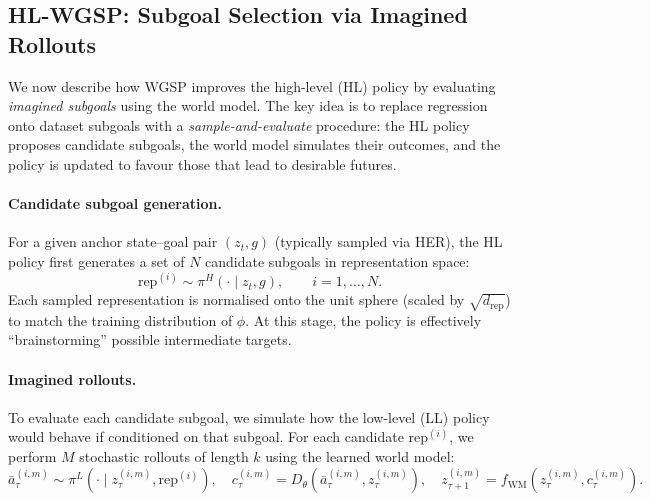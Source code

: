 
\subsection{HL-WGSP: Subgoal Selection via Imagined Rollouts}
\label{sec:wgsp:hlwgsp}

We now describe how WGSP improves the high-level (HL) policy by
evaluating \emph{imagined subgoals} using the world model. The key idea
is to replace regression onto dataset subgoals with a
\emph{sample-and-evaluate} procedure: the HL policy proposes candidate
subgoals, the world model simulates their outcomes, and the policy is
updated to favour those that lead to desirable futures.

\paragraph{Candidate subgoal generation.}
For a given anchor state--goal pair $(z_t, g)$ (typically sampled via
HER), the HL policy first generates a set of $N$ candidate subgoals in
representation space:
\begin{equation}
\text{rep}^{(i)} \sim \pi^H(\cdot \mid z_t, g), \qquad i = 1, \dots, N.
\label{eq:wgsp-rep-sample-clean}
\end{equation}
Each sampled representation is normalised onto the unit sphere (scaled
by $\sqrt{d_{\mathrm{rep}}}$) to match the training distribution of
$\phi$. At this stage, the policy is effectively ``brainstorming''
possible intermediate targets.

\paragraph{Imagined rollouts.}
To evaluate each candidate subgoal, we simulate how the low-level (LL)
policy would behave if conditioned on that subgoal. For each candidate
$\text{rep}^{(i)}$, we perform $M$ stochastic rollouts of length $k$
using the learned world model:
\begin{equation}
\bar a_\tau^{(i,m)} \sim \pi^L(\cdot \mid z_\tau^{(i,m)}, \text{rep}^{(i)}), \quad
c_\tau^{(i,m)} = D_\theta(\bar a_\tau^{(i,m)}, z_\tau^{(i,m)}), \quad
z_{\tau+1}^{(i,m)} = f_{\mathrm{WM}}(z_\tau^{(i,m)}, c_\tau^{(i,m)}).
\label{eq:wgsp-rollout-clean}
\end{equation}

